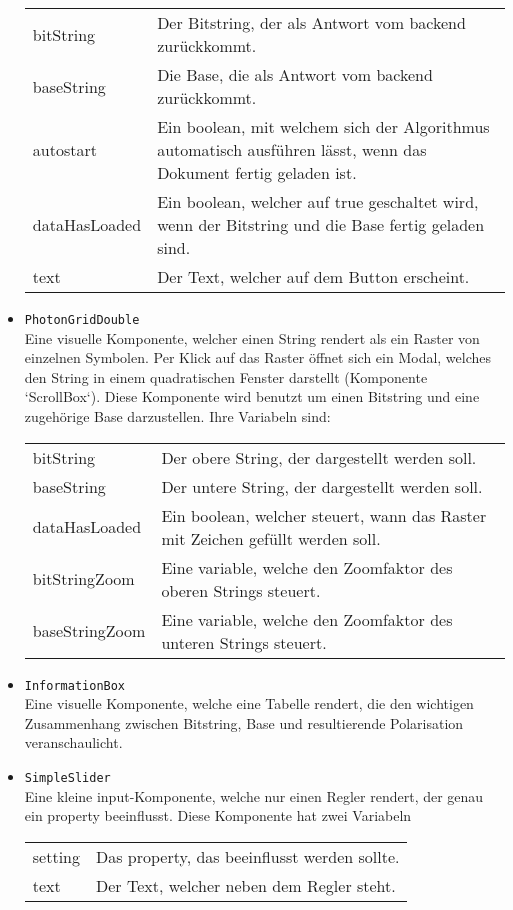\documentclass[a4paper,10.2pt,pdftex]{scrartcl}%
\begin{document}
\begin{itemize}
\begin{tabularx}{\textwidth}{p{3cm}p{11cm}}
bitString & Der Bitstring, der als Antwort vom backend zurückkommt. \\
baseString &  Die Base, die als Antwort vom backend zurückkommt. \\
autostart & Ein boolean, mit welchem sich der Algorithmus automatisch ausführen lässt, wenn das Dokument fertig geladen ist. \\
dataHasLoaded & Ein boolean, welcher auf true geschaltet wird, wenn der Bitstring und die Base fertig geladen sind. \\
text &  Der Text, welcher auf dem Button erscheint. 
\end{tabularx}
\item \texttt{PhotonGridDouble}\\
 Eine visuelle Komponente, welcher einen String rendert als ein Raster von einzelnen Symbolen. Per Klick auf das Raster öffnet sich ein Modal, welches den String in einem quadratischen Fenster darstellt (Komponente `ScrollBox`). Diese Komponente wird benutzt um einen Bitstring und eine zugehörige Base darzustellen. Ihre Variabeln sind: \\[3mm]
\begin{tabularx}{\textwidth}{p{3cm}p{11cm}} 
bitString & Der obere String, der dargestellt werden soll. \\
baseString & Der untere String, der dargestellt werden soll. \\
dataHasLoaded & Ein boolean, welcher steuert, wann das Raster mit Zeichen gefüllt werden soll. \\
bitStringZoom & Eine variable, welche den Zoomfaktor des oberen Strings steuert. \\
baseStringZoom & Eine variable, welche den Zoomfaktor des unteren Strings steuert.
\end{tabularx}
\item \texttt{InformationBox} \\
Eine visuelle Komponente, welche eine Tabelle rendert, die den wichtigen Zusammenhang zwischen Bitstring, Base und resultierende Polarisation veranschaulicht.
\item \texttt{SimpleSlider} \\
 Eine kleine input-Komponente, welche nur einen Regler rendert, der genau ein property beeinflusst. Diese Komponente hat zwei Variabeln \\[3mm]
\begin{tabularx}{\textwidth}{p{3cm}p{11cm}} 
setting & Das property, das beeinflusst werden sollte. \\
text & Der Text, welcher neben dem Regler steht.

\end{tabularx}
\end{itemize}
\end{document}
